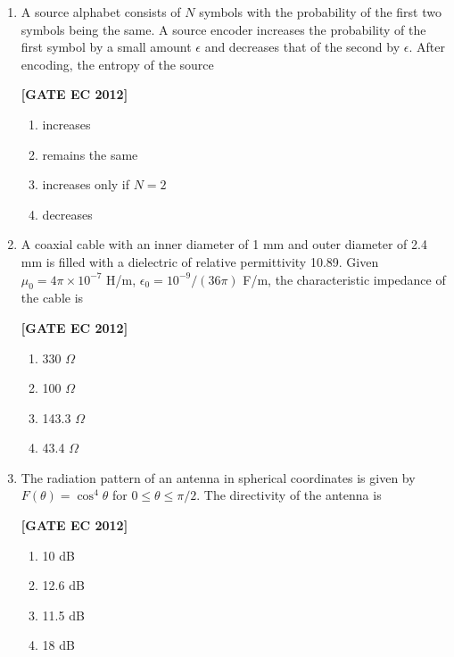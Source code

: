 \documentclass[12pt]{article}
\begin{document}
\begin{enumerate}[leftmargin=1.0em, label=\textbf{Q.\arabic*.}, itemsep=2em]
\item A source alphabet consists of $N$ symbols with the probability of the first two symbols being the same. A source encoder increases the probability of the first symbol by a small amount $\epsilon$ and decreases that of the second by $\epsilon$. After encoding, the entropy of the source

\noindent \textbf{[GATE EC 2012]}
\begin{multicols}{2}
    \begin{enumerate}
        \item increases
        \item remains the same
        \item increases only if $N=2$
        \item decreases
    \end{enumerate}
\end{multicols}

\item A coaxial cable with an inner diameter of 1 mm and outer diameter of 2.4 mm is filled with a dielectric of relative permittivity 10.89. Given $\mu_0 = 4\pi \times 10^{-7}$ H/m, $\epsilon_0 = 10^{-9}/(36\pi)$ F/m, the characteristic impedance of the cable is

\noindent \textbf{[GATE EC 2012]}
\begin{multicols}{2}
    \begin{enumerate}
        \item 330 $\Omega$
        \item 100 $\Omega$
        \item 143.3 $\Omega$
        \item 43.4 $\Omega$
    \end{enumerate}
\end{multicols}

\item The radiation pattern of an antenna in spherical coordinates is given by $F(\theta) = \cos^4\theta$ for $0 \leq \theta \leq \pi/2$. The directivity of the antenna is

\noindent \textbf{[GATE EC 2012]}
\begin{multicols}{2}
    \begin{enumerate}
        \item 10 dB
        \item 12.6 dB
        \item 11.5 dB
        \item 18 dB
    \end{enumerate}
\end{multicols}


\end{enumerate}
\end{document}
